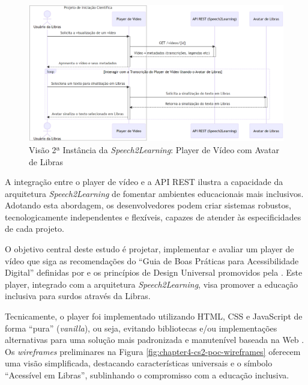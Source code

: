 \begin{figure}[htbp]
\centering
\caption{Visão 2ª Instância da \textit{Speech2Learning}: Player de Vídeo com Avatar de Libras}
\label{fig:chapter4-cs2-poc-diagram}
\includegraphics[width=.94\textwidth]{images/chapter4-cs2-poc-diagram.png}
\end{figure}

A integração entre o player de vídeo e a API REST ilustra a capacidade da arquitetura \textit{Speech2Learning} de fomentar ambientes educacionais mais inclusivos. Adotando esta abordagem, os desenvolvedores podem criar sistemas robustos, tecnologicamente independentes e flexíveis, capazes de atender às especificidades de cada projeto.

O objetivo central deste estudo é projetar, implementar e avaliar um player de vídeo que siga as recomendações do ``Guia de Boas Práticas para Acessibilidade Digital'' definidas por  e os princípios de Design Universal promovidos pela . Este player, integrado com a arquitetura \textit{Speech2Learning}, visa promover a educação inclusiva para surdos através da Libras.

Tecnicamente, o player foi implementado utilizando HTML, CSS e JavaScript de forma ``pura'' (\textit{vanilla}), ou seja, evitando bibliotecas e/ou implementações alternativas para uma solução mais padronizada e manutenível baseada na Web \cite{GovBr2023}. Os \textit{wireframes} preliminares na Figura \ref{fig:chapter4-cs2-poc-wireframes} oferecem uma visão simplificada, destacando características universais e o símbolo ``Acessível em Libras'', sublinhando o compromisso com a educação inclusiva.


